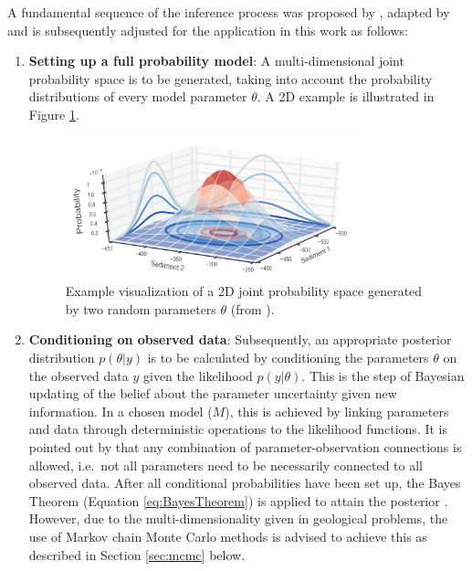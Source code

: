         A fundamental sequence of the inference process was proposed by \citet{gelman2014bayesian}, adapted by \citet{delaVarga2016} and is subsequently adjusted for the application in this work as follows:
        \begin{enumerate}
        	\item \textbf{Setting up a full probability model}: A multi-dimensional joint probability space is to be generated, taking into account the probability distributions of every model parameter $\theta$. A 2D example is illustrated in Figure \ref{fig:joint_prob}.
	        \begin{figure}[h]
				\centering
				\includegraphics[width=0.8\textwidth]{Figures/joint_prob}
				\caption{Example visualization of a 2D joint probability space generated by two random parameters $\theta$ (from \citet{delaVarga2016}).}\label{fig:joint_prob} 
			\end{figure}
        	\item \textbf{Conditioning on observed data}: Subsequently, an appropriate posterior distribution $p(\theta|y)$ is to be calculated by conditioning the parameters $\theta$ on the observed data $y$ given the likelihood $p(y|\theta)$. This is the step of Bayesian updating of the belief about the parameter uncertainty given new information.
        	In a chosen model ($M$), this is achieved by linking parameters and data through deterministic operations to the likelihood functions. It is pointed out by \citet{delaVarga2016} that any combination of parameter-observation connections is allowed, i.e.\ not all parameters need to be necessarily connected to all observed data. After all conditional probabilities have been set up, the Bayes Theorem (Equation \ref{eq:BayesTheorem}) is applied to attain the posterior \citep{delaVarga2016}. However, due to the multi-dimensionality given in geological problems, the use of Markov chain Monte Carlo methods is advised to achieve this as described in Section \ref{sec:mcmc} below.

\end{enumerate}
